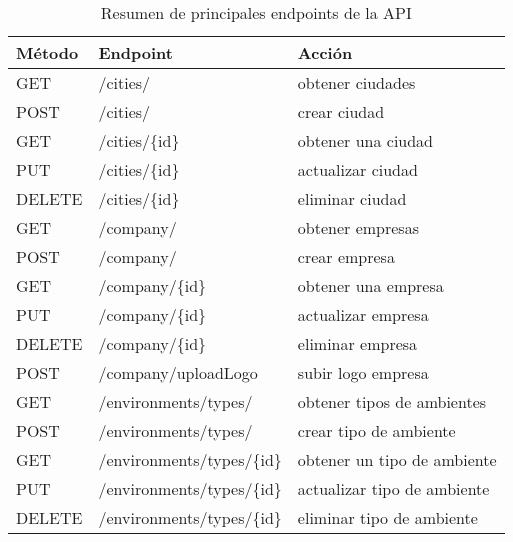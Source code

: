 \begin{table}[H]
    \centering
    \caption[Resumen de principales endpoints de la API]{Resumen de principales endpoints de la API}
    \begin{tabular}{l l l}
        \toprule
        \textbf{Método} & \textbf{Endpoint}              & \textbf{Acción}              \\
        \midrule
        GET             & /cities/                       & obtener ciudades             \\
        POST            & /cities/                       & crear ciudad                 \\
        GET             & /cities/\{id\}                   & obtener una ciudad           \\
        PUT             & /cities/\{id\}                   & actualizar ciudad            \\
        DELETE          & /cities/\{id\}                   & eliminar ciudad              \\
        \midrule
        GET             & /company/                      & obtener empresas             \\
        POST            & /company/                      & crear empresa                \\
        GET             & /company/\{id\}                  & obtener una empresa          \\
        PUT             & /company/\{id\}                  & actualizar empresa           \\
        DELETE          & /company/\{id\}                  & eliminar empresa             \\
        POST            & /company/uploadLogo            & subir logo empresa           \\
        \midrule
        GET             & /environments/types/           & obtener tipos de ambientes   \\
        POST            & /environments/types/           & crear tipo de ambiente       \\
        GET             & /environments/types/\{id\}       & obtener un tipo de ambiente  \\
        PUT             & /environments/types/\{id\}       & actualizar tipo de ambiente  \\
        DELETE          & /environments/types/\{id\}       & eliminar tipo de ambiente    \\

\end{tabular}
\end{table}
